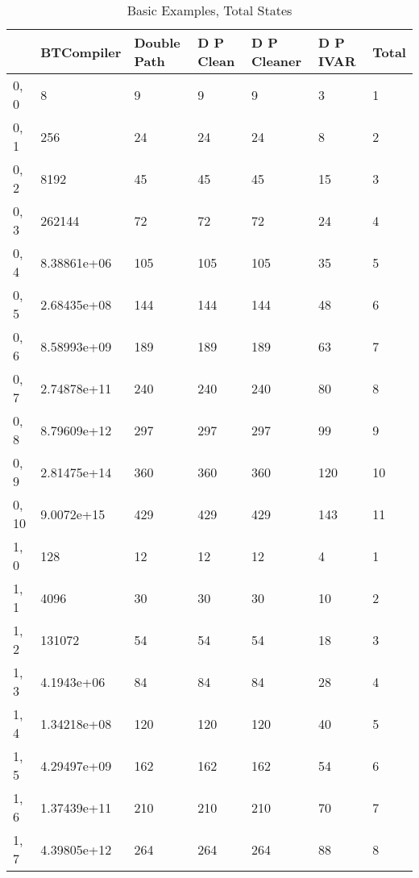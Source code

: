 \begin{table}
\centering
\caption{Basic Examples, Total States}
\label{b_e_total}
\begin{tabular}{lllllll}
\toprule
{} &   BTCompiler & Double Path & D P Clean & D P Cleaner & D P IVAR & Total \\
\midrule
0, 0   &            8 &           9 &         9 &           9 &        3 &     1 \\
0, 1   &          256 &          24 &        24 &          24 &        8 &     2 \\
0, 2   &         8192 &          45 &        45 &          45 &       15 &     3 \\
0, 3   &       262144 &          72 &        72 &          72 &       24 &     4 \\
0, 4   &  8.38861e+06 &         105 &       105 &         105 &       35 &     5 \\
0, 5   &  2.68435e+08 &         144 &       144 &         144 &       48 &     6 \\
0, 6   &  8.58993e+09 &         189 &       189 &         189 &       63 &     7 \\
0, 7   &  2.74878e+11 &         240 &       240 &         240 &       80 &     8 \\
0, 8   &  8.79609e+12 &         297 &       297 &         297 &       99 &     9 \\
0, 9   &  2.81475e+14 &         360 &       360 &         360 &      120 &    10 \\
0, 10  &   9.0072e+15 &         429 &       429 &         429 &      143 &    11 \\
1, 0   &          128 &          12 &        12 &          12 &        4 &     1 \\
1, 1   &         4096 &          30 &        30 &          30 &       10 &     2 \\
1, 2   &       131072 &          54 &        54 &          54 &       18 &     3 \\
1, 3   &   4.1943e+06 &          84 &        84 &          84 &       28 &     4 \\
1, 4   &  1.34218e+08 &         120 &       120 &         120 &       40 &     5 \\
1, 5   &  4.29497e+09 &         162 &       162 &         162 &       54 &     6 \\
1, 6   &  1.37439e+11 &         210 &       210 &         210 &       70 &     7 \\
1, 7   &  4.39805e+12 &         264 &       264 &         264 &       88 &     8 \\

\end{tabular}
\end{table}
